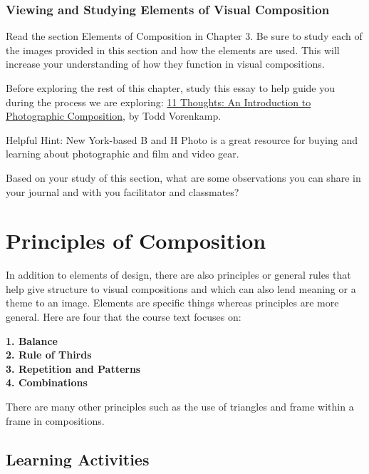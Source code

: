 \documentclass[
]{book}
\begin{document}
\hypertarget{viewing-and-studying-elements-of-visual-composition}{%
\subsubsection*{Viewing and Studying Elements of Visual Composition}\label{viewing-and-studying-elements-of-visual-composition}}

Read the section Elements of Composition in Chapter 3. Be sure to study each of the images provided in this section and how the elements are used. This will increase your understanding of how they function in visual compositions.

Before exploring the rest of this chapter, study this essay to help guide you during the process we are exploring: \href{https://www.bhphotovideo.com/explora/photography/tips-and-solutions/11-thoughts-introduction-photographic-composition}{11 Thoughts: An Introduction to Photographic Composition}, by Todd Vorenkamp.

Helpful Hint: New York-based B and H Photo is a great resource for buying and learning about photographic and film and video gear.

Based on your study of this section, what are some observations you can share in your journal and with you facilitator and classmates?

\hypertarget{principles-of-composition}{%
\section*{Principles of Composition}\label{principles-of-composition}}

In addition to elements of design, there are also principles or general rules that help give structure to visual compositions and which can also lend meaning or a theme to an image. Elements are specific things whereas principles are more general. Here are four that the course text focuses on:

\textbf{1. Balance}\\
\textbf{2. Rule of Thirds}\\
\textbf{3. Repetition and Patterns}\\
\textbf{4. Combinations}

There are many other principles such as the use of triangles and frame within a frame in compositions.

\hypertarget{learning-activities-8}{%
\subsection*{Learning Activities}\label{learning-activities-8}}
\end{document}
